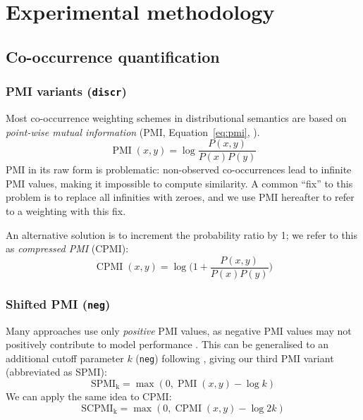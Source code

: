 \chapter{Experimental methodology}
\label{sec:methodology}


\section{Co-occurrence quantification}
\label{sec:parameters}

\subsection{PMI variants (\texttt{discr})}
\label{sec:pmi-variants}

Most co-occurrence weighting schemes in distributional semantics are based on \emph{point-wise mutual information} (PMI, Equation~\ref{eq:pmi}, ).
%
\begin{equation}
  \label{eq:pmi}
  \operatorname{PMI}(x, y) = \log\frac{P(x,y)}{P(x)P(y)}
\end{equation}
%
PMI in its raw form is problematic: non-observed co-occurrences lead to infinite PMI values, making it impossible to compute similarity. A common ``fix'' to this problem is to replace all infinities with zeroes, and we use PMI hereafter to refer to a weighting with this fix.

An alternative solution is to increment the probability ratio by 1; we refer to this as \textit{compressed PMI} (CPMI):
%
\begin{equation}
  \label{eq:cpmi}
  \operatorname{CPMI}(x, y) = \log\Big( 1 + \frac{P(x,y)}{P(x)P(y)} \Big)
\end{equation}

\subsection{Shifted PMI (\texttt{neg})}
\label{sec:shifted-pmi}

Many approaches use only \emph{positive} PMI values, as  negative PMI values may not positively contribute to model performance \cite{Turney:2010:FMV:1861751.1861756}. This can be generalised to an additional cutoff parameter $k$ (\texttt{neg}) following , giving our third PMI variant (abbreviated as SPMI):
%
\begin{equation}
  \label{eq:ppmi}
  \operatorname{SPMI_k} = \max (0, \operatorname{PMI}(x, y) - \log k)
\end{equation}
%
We can apply the same idea to CPMI:
%
\begin{equation}
  \label{eq:pcpmi}
  \operatorname{SCPMI_k} = \max (0, \operatorname{CPMI}(x, y) - \log 2k)
\end{equation}

